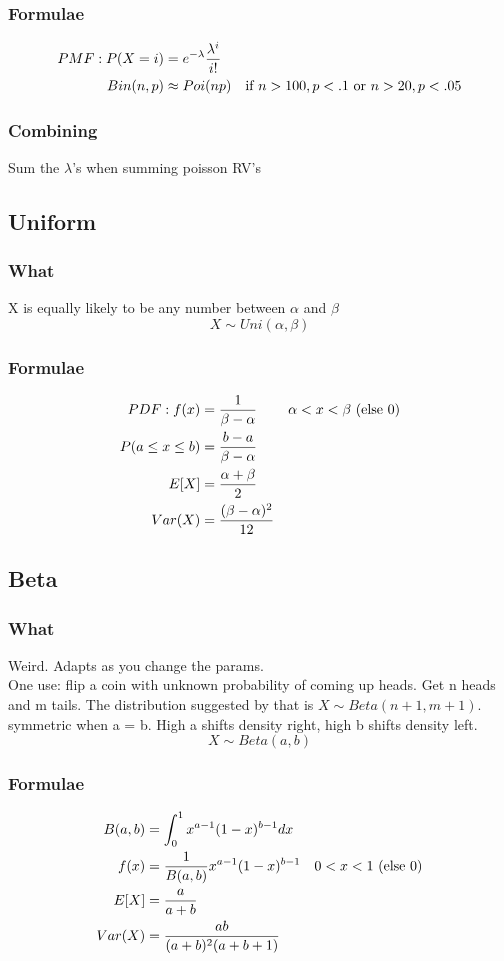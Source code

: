 \documentclass[12pt]{amsart}
\begin{document}
\subsubsection{Formulae}
\begin{align*}
PMF: P(X=i) &= e^{-\lambda} {\lambda^i \over i!} \\
Bin(n, p) &\approx Poi(np) & \text{if } n > 100, p < .1 \text{ or } n > 20, p < .05
\end{align*}
\subsubsection{Combining}
Sum the $\lambda$'s when summing poisson RV's
%
\subsection{Uniform}
\subsubsection{What}
X is equally likely to be any number between $\alpha$ and $\beta$
\[
X \sim Uni(\alpha, \beta)
\]
\subsubsection{Formulae}
\begin{align*}
PDF: f(x) &= {1 \over \beta - \alpha} & \alpha < x < \beta \text{ (else 0)} \\
P(a \leq x \leq b) &= {b - a \over \beta - \alpha} \\
E[X] &= {\alpha + \beta \over 2} \\
Var(X) &= {(\beta - \alpha)^2 \over 12}
\end{align*}
%
\subsection{Beta}
\subsubsection{What}
Weird. Adapts as you change the params.\\
One use: flip a coin with unknown probability of coming up heads. Get n heads and m tails. The distribution suggested by that is $X \sim Beta(n + 1, m + 1)$. \\
symmetric when a = b.  High a shifts density right, high b shifts density left.
\[
X \sim Beta(a,b)
\]
\subsubsection{Formulae}
\begin{align*}
B(a,b) &= \int_0^1 x^{a-1} (1-x)^{b-1} dx \\
f(x) &= {1 \over B(a,b)} x^{a-1} (1-x)^{b-1} & 0 < x < 1 \text{ (else }0)\\
E[X] &= {a \over a + b} \\
Var(X) &= {ab \over (a + b)^2 (a + b + 1)}
\end{align*}
%
\end{document}
